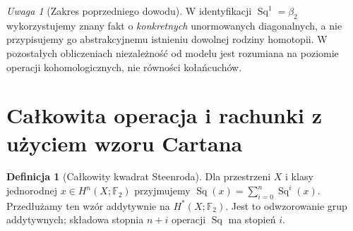 \documentclass[11pt,a4paper,oneside]{report}
\newcommand{\F}{\mathbb{F}}
\theoremstyle{plain}
\theoremstyle{definition}
\newtheorem{definicja}[twierdzenie]{Definicja}
\theoremstyle{remark}
\newtheorem{uwaga}[twierdzenie]{Uwaga}
\begin{document}
\begin{uwaga}[Zakres poprzedniego dowodu]
W identyfikacji $\operatorname{Sq}^1=\beta_2$ wykorzystujemy
znany fakt o \emph{konkretnych} unormowanych diagonalnych, a nie
przypisujemy go abstrakcyjnemu istnieniu dowolnej rodziny homotopii.
W pozostałych obliczeniach niezależność od modelu jest rozumiana
na poziomie operacji kohomologicznych, nie równości kołańcuchów.
\end{uwaga}

\section{Całkowita operacja i rachunki z użyciem wzoru Cartana}
\begin{definicja}[Całkowity kwadrat Steenroda]
Dla przestrzeni $X$ i klasy jednorodnej $x\in H^n(X;\F_2)$
przyjmujemy $\operatorname{Sq}(x)=\sum_{i=0}^n\operatorname{Sq}^i(x)$.
Przedłużamy ten wzór addytywnie na $H^*(X;\F_2)$.
Jest to odwzorowanie grup addytywnych; składowa stopnia $n+i$
operacji $\operatorname{Sq}$ ma stopień $i$.
\end{definicja}
\end{document}
